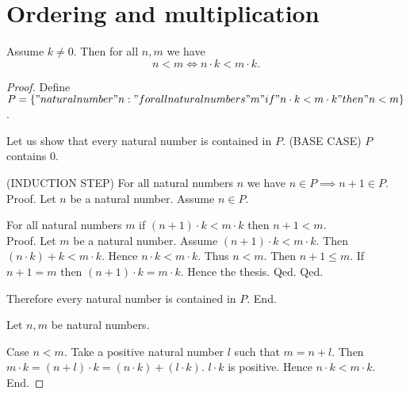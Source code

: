 \documentclass[../../natural-numbers.ftl.tex]{subfiles}
\begin{document}


  \section{Ordering and multiplication}

  \begin{forthel}
    \begin{proposition}[NN 02 03 496205]
      Assume $k \neq 0$.
      Then for all $n,m$ we have
      $$n < m \iff n \cdot k < m \cdot k.$$
    \end{proposition}
    \begin{proof}
      Define $P = \{ "natural number" n : "for all natural numbers" m "if" n \cdot k < m \cdot k "then" n < m \}$.

      Let us show that every natural number is contained in $P$.
        (BASE CASE) $P$ contains $0$.

        (INDUCTION STEP) For all natural numbers $n$ we have $n \in P \implies n + 1 \in P$.
        Proof.
          Let $n$ be a natural number.
          Assume $n \in P$.

          For all natural numbers $m$ if $(n + 1) \cdot k < m \cdot k$ then $n + 1 < m$. \\
          Proof.
            Let $m$ be a natural number.
            Assume $(n + 1) \cdot k < m \cdot k$.
            Then $(n \cdot k) + k < m \cdot k$.
            Hence $n \cdot k < m \cdot k$.
            Thus $n < m$.
            Then $n + 1 \leq m$.
            If $n + 1 = m$ then $(n + 1) \cdot k = m \cdot k$.
            Hence the thesis.
          Qed.
        Qed.

        Therefore every natural number is contained in $P$.
      End.

      Let $n,m$ be natural numbers.

      Case $n < m$.
        Take a positive natural number $l$ such that $m = n + l$.
        Then $m \cdot k = (n + l) \cdot k = (n \cdot k) + (l \cdot k)$.
        $l \cdot k$ is positive.
        Hence $n \cdot k < m \cdot k$.
      End.


\end{proof}
\end{forthel}
\end{document}
